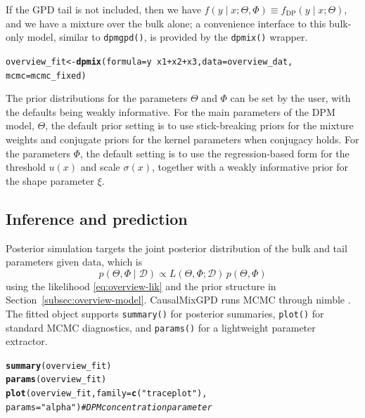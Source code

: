\documentclass[article]{jss}\usepackage[]{graphicx}\usepackage[]{xcolor}
\makeatletter
\newcommand{\hlsng}[1]{\textcolor[rgb]{0.192,0.494,0.8}{#1}}%
\newcommand{\hlcom}[1]{\textcolor[rgb]{0.678,0.584,0.686}{\textit{#1}}}%
\newcommand{\hlopt}[1]{\textcolor[rgb]{0,0,0}{#1}}%
\newcommand{\hldef}[1]{\textcolor[rgb]{0.345,0.345,0.345}{#1}}%
\newcommand{\hlkwb}[1]{\textcolor[rgb]{0.69,0.353,0.396}{#1}}%
\newcommand{\hlkwc}[1]{\textcolor[rgb]{0.333,0.667,0.333}{#1}}%
\newcommand{\hlkwd}[1]{\textcolor[rgb]{0.737,0.353,0.396}{\textbf{#1}}}%
\newenvironment{kframe}{%
 \def\at@end@of@kframe{}%
 \ifinner\ifhmode%
  \def\at@end@of@kframe{\end{minipage}}%
  \begin{minipage}{\columnwidth}%
 \fi\fi%
 \def\FrameCommand##1{\hskip\@totalleftmargin \hskip-\fboxsep
 \colorbox{shadecolor}{##1}\hskip-\fboxsep
     \hskip-\linewidth \hskip-\@totalleftmargin \hskip\columnwidth}%
 \MakeFramed {\advance\hsize-\width
   \@totalleftmargin\z@ \linewidth\hsize
   \@setminipage}}%
 {\par\unskip\endMakeFramed%
 \at@end@of@kframe}
\newenvironment{knitrout}{}{} %
\DeclareRobustCommand{\pkg}[1]{\textsf{#1}}
\DeclareRobustCommand{\code}[1]{\nolinkurl{#1}}
\makeatother
\begin{document}
If the GPD tail is not included, then we have
$f(y\mid x;\Theta, \Phi) \equiv f_{\text{DP}}(y \mid x; \Theta)$, and we
have a mixture over the bulk alone; a convenience interface to this bulk-only
model, similar to \code{dpmgpd()}, is provided by the \code{dpmix()} wrapper.
\begin{knitrout}\footnotesize
{}\color{fgcolor}\begin{kframe}
\begin{alltt}
\hldef{overview_fit} \hlkwb{<-} \hlkwd{dpmix}\hldef{(}\hlkwc{formula} \hldef{= y} \hlopt{~} \hldef{x1} \hlopt{+} \hldef{x2} \hlopt{+} \hldef{x3,}  \hlkwc{data} \hldef{= overview_dat,}
                      \hlkwc{mcmc} \hldef{= mcmc_fixed)}
\end{alltt}
\end{kframe}
\end{knitrout}

The prior distributions for the parameters $\Theta$ and $\Phi$ can be set by the user, with the defaults being weakly informative. For the main parameters of the DPM model, $\Theta$, the default prior setting is to use stick-breaking priors for the mixture weights and conjugate priors for the kernel parameters when conjugacy holds. For the parameters $\Phi$, the default setting is to use the regression-based form for the threshold $u(x)$ and scale $\sigma(x)$, together with a weakly informative prior for the shape parameter $\xi$.

\subsection{Inference and prediction}
\label{subsec:overview-mcmc}

Posterior simulation targets the joint posterior distribution of the bulk and tail parameters given data,
which is
$$p(\Theta,\Phi\mid \mathcal{D}) \propto L(\Theta,\Phi;\mathcal{D})\,p(\Theta,\Phi)$$
using the likelihood \eqref{eq:overview-lik} and the prior structure in
Section~\ref{subsec:overview-model}. \pkg{CausalMixGPD} runs MCMC
through \pkg{nimble} \citep{nimble_pkg}. The fitted object supports \code{summary()}
for posterior summaries, \code{plot()} for standard MCMC diagnostics,
and \code{params()} for a lightweight parameter extractor.
\begin{knitrout}\footnotesize
{}\color{fgcolor}\begin{kframe}
\begin{alltt}
\hlkwd{summary}\hldef{(overview_fit)}
\hlkwd{params}\hldef{(overview_fit)}
\hlkwd{plot}\hldef{(overview_fit,} \hlkwc{family} \hldef{=} \hlkwd{c}\hldef{(}\hlsng{"traceplot"}\hldef{),}
     \hlkwc{params} \hldef{=} \hlsng{"alpha"}\hldef{)}  \hlcom{# DPM concentration parameter}
\end{alltt}
\end{kframe}
\end{knitrout}
\end{document}
